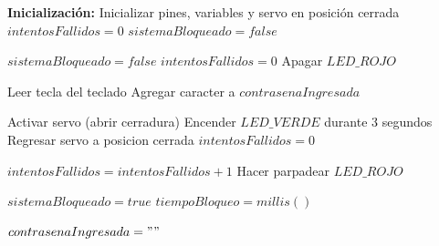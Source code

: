 \begin{algorithm}[ht]
\caption{Algoritmo de Control de Acceso}
\label{alg:Algoritmo1}
\begin{algorithmic}[1]

\Statex \textbf{Inicialización:}
\State Inicializar pines, variables y servo en posición cerrada
\State $intentosFallidos = 0$
\State $sistemaBloqueado = false$



            \State $sistemaBloqueado = false$
            \State $intentosFallidos = 0$
            \State Apagar $LED\_ROJO$
        \EndIf

    \Else

        \State Leer tecla del teclado
        \State Agregar caracter a $contrasenaIngresada$



                \State Activar servo (abrir cerradura)
                \State Encender $LED\_VERDE$ durante 3 segundos
                \State Regresar servo a posicion cerrada
                \State $intentosFallidos = 0$

            \Else

                \State $intentosFallidos = intentosFallidos + 1$
                \State Hacer parpadear $LED\_ROJO$

                    \State $sistemaBloqueado = true$
                    \State $tiempoBloqueo = millis()$
                \EndIf

            \EndIf

            \State $contrasenaIngresada = " "$

        \EndIf

    \EndIf

\EndWhile

\end{algorithmic}
\end{algorithm}